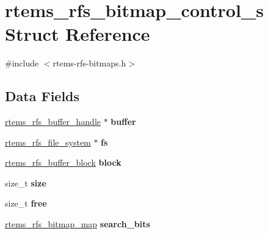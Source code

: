 \hypertarget{structrtems__rfs__bitmap__control__s}{}\section{rtems\+\_\+rfs\+\_\+bitmap\+\_\+control\+\_\+s Struct Reference}
\label{structrtems__rfs__bitmap__control__s}


{\ttfamily \#include $<$rtems-\/rfs-\/bitmaps.\+h$>$}

\subsection*{Data Fields}
\begin{DoxyCompactItemize}
\item 
\mbox{\label{structrtems__rfs__bitmap__control__s_a447adb8655c1f6849b36646a3d73a04c}} 
\mbox{\hyperlink{rtems-rfs-buffer_8h_a17f97c37c5273ad28d413dfd2d175e23}{rtems\+\_\+rfs\+\_\+buffer\+\_\+handle}} $\ast$ {\bfseries buffer}
\item 
\mbox{\label{structrtems__rfs__bitmap__control__s_a83a6e4217e486439719c7e824783fb33}} 
\mbox{\hyperlink{struct__rtems__rfs__file__system}{rtems\+\_\+rfs\+\_\+file\+\_\+system}} $\ast$ {\bfseries fs}
\item 
\mbox{\label{structrtems__rfs__bitmap__control__s_a6e38474c044b28eff5fb5720ed95639d}} 
\mbox{\hyperlink{rtems-rfs-buffer_8h_a5650d53328a5af0a78198fe780aec043}{rtems\+\_\+rfs\+\_\+buffer\+\_\+block}} {\bfseries block}
\item 
\mbox{\label{structrtems__rfs__bitmap__control__s_a5bc9046b3ebc50e157f3bee9da8972a9}} 
size\+\_\+t {\bfseries size}
\item 
\mbox{\label{structrtems__rfs__bitmap__control__s_abc1224ada06088c9ee272216176ea3dd}} 
size\+\_\+t {\bfseries free}
\item 
\mbox{\label{structrtems__rfs__bitmap__control__s_af8d7fec380b140c32392b3409247a9a5}} 
\mbox{\hyperlink{rtems-rfs-bitmaps_8h_ad7417fa816b1cfccbc03fc564a5b341b}{rtems\+\_\+rfs\+\_\+bitmap\+\_\+map}} {\bfseries search\+\_\+bits}
\end{DoxyCompactItemize}


